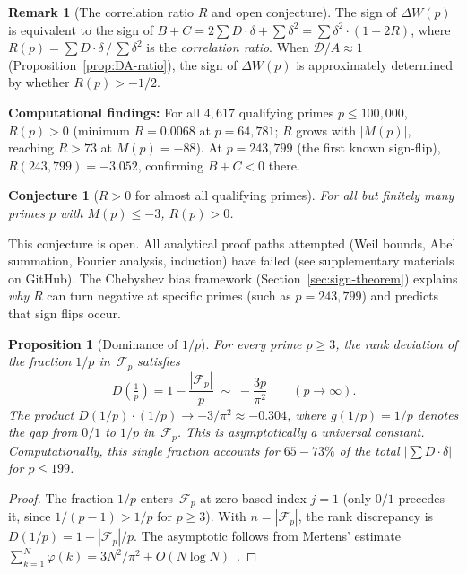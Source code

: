 \documentclass[11pt]{article}
\newtheorem{proposition}[theorem]{Proposition}
\newtheorem{conjecture}[theorem]{Conjecture}
\theoremstyle{definition}
\newtheorem{remark}[theorem]{Remark}
\newcommand{\F}{\mathcal{F}}
\begin{document}
\begin{remark}[The correlation ratio $R$ and open conjecture]
The sign of $\Delta W(p)$ is equivalent to the sign of
$B + C = 2\sum D \cdot \delta + \sum \delta^2 = \sum\delta^2 \cdot (1 + 2R)$,
where $R(p) = \sum D \cdot \delta \,/\, \sum \delta^2$ is
the \emph{correlation ratio}.  When $\mathcal{D}/A \approx 1$ (Proposition~\ref{prop:DA-ratio}),
the sign of $\Delta W(p)$ is approximately determined by
whether $R(p) > -1/2$.

\textbf{Computational findings:}
For all $4{,}617$ qualifying primes $p \le 100{,}000$,
$R(p) > 0$ (minimum $R = 0.0068$ at $p = 64{,}781$; $R$ grows
with $|M(p)|$, reaching $R > 73$ at $M(p) = -88$).
At $p = 243{,}799$ (the first known sign-flip),
$R(243{,}799) = -3.052$, confirming $B + C < 0$ there.

\begin{conjecture}[$R > 0$ for almost all qualifying primes]
For all but finitely many primes $p$ with $M(p) \le -3$,
$R(p) > 0$.
\end{conjecture}

\noindent This conjecture is open.  All analytical proof
paths attempted (Weil bounds, Abel summation,
Fourier analysis, induction) have failed
(see supplementary materials on GitHub).
The Chebyshev bias framework (Section~\ref{sec:sign-theorem})
explains \emph{why} $R$ can turn negative at specific primes
(such as $p = 243{,}799$) and predicts that sign flips occur.
\end{remark}

\begin{proposition}[Dominance of $1/p$]\label{prop:D1p}
For every prime $p\ge3$, the rank deviation of the fraction
$1/p$ in~$\F_p$ satisfies
\[
  D\!\left(\tfrac{1}{p}\right)
  = 1 - \frac{|\F_p|}{p}
  \;\sim\; -\frac{3p}{\pi^2}
  \qquad(p\to\infty).
\]
The product $D(1/p)\cdot(1/p) \to -3/\pi^2\approx -0.304$,
where $g(1/p) = 1/p$ denotes the gap from $0/1$ to $1/p$ in~$\F_p$.
This
is asymptotically a universal constant.  Computationally, this
single fraction accounts for $65{-}73\%$ of the total
$|\sum D\cdot\delta|$ for $p\le199$.
\end{proposition}

\begin{proof}
The fraction $1/p$ enters~$\F_p$ at zero-based index $j=1$
(only $0/1$ precedes it, since $1/(p{-}1) > 1/p$ for $p\ge3$).
With $n = |\F_p|$, the rank discrepancy is
$D(1/p) = 1 - |\F_p|/p$.
The asymptotic follows from Mertens' estimate
$\sum_{k=1}^{N}\varphi(k) = 3N^2/\pi^2 + O(N\log N)$~\cite{HardyWright2008}.
\end{proof}
\end{document}
